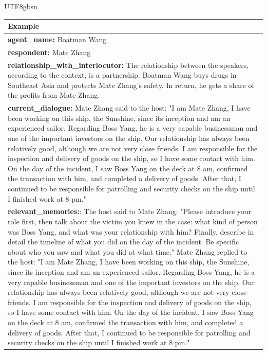 \documentclass[11pt]{article}
\begin{document}
{\begin{CJK}{UTF8}{gbsn}
\begin{table}[ht!]
\begin{minipage}[t]{\linewidth}
\begin{tabular}{|m{16cm}|}
\hline
\rowcolor{lightgray}  \textbf{Example}  \\
\hline
\textbf{   agent\_name:} \small Boatman Wang\\
\textbf{   respondent:} \small Mate Zhang\\
\textbf{   relationship\_with\_interlocutor:} \small The relationship between the speakers, according to the context, is a partnership. Boatman Wang buys drugs in Southeast Asia and protects Mate Zhang's safety. In return, he gets a share of the profits from Mate Zhang. \\
\textbf{   current\_dialogue:} \small Mate Zhang said to the host: "I am Mate Zhang, I have been working on this ship, the Sunshine, since its inception and am an experienced sailor. Regarding Boss Yang, he is a very capable businessman and one of the important investors on the ship. Our relationship has always been relatively good, although we are not very close friends. I am responsible for the inspection and delivery of goods on the ship, so I have some contact with him. On the day of the incident, I saw Boss Yang on the deck at 8 am, confirmed the transaction with him, and completed a delivery of goods. After that, I continued to be responsible for patrolling and security checks on the ship until I finished work at 8 pm."\\
\textbf{   relevant\_memories:}: \small The host said to Mate Zhang: "Please introduce your role first, then talk about the victim you knew in the case: what kind of person was Boss Yang, and what was your relationship with him? Finally, describe in detail the timeline of what you did on the day of the incident. Be specific about who you saw and what you did at what time."
Mate Zhang replied to the host: "I am Mate Zhang, I have been working on this ship, the Sunshine, since its inception and am an experienced sailor. Regarding Boss Yang, he is a very capable businessman and one of the important investors on the ship. Our relationship has always been relatively good, although we are not very close friends. I am responsible for the inspection and delivery of goods on the ship, so I have some contact with him. On the day of the incident, I saw Boss Yang on the deck at 8 am, confirmed the transaction with him, and completed a delivery of goods. After that, I continued to be responsible for patrolling and security checks on the ship until I finished work at 8 pm." \\


\end{tabular}
\end{minipage}
\end{table}
\end{CJK}}
\end{document}
